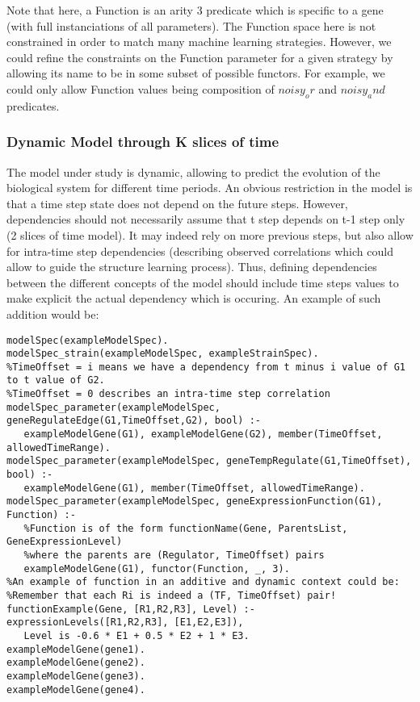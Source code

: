 \documentclass{article}
\begin{document}
Note that here, a Function is an arity 3 predicate which is specific to a gene (with full instanciations of all parameters). The Function space here is not constrained in order to match many machine learning strategies. However, we could refine the constraints on the Function parameter for a given strategy by allowing its name to be in some subset of possible functors. For example, we could only allow Function values being composition of $noisy_or$ and $noisy_and$ predicates.
\subsubsection{Dynamic Model through K slices of time}

The model under study is dynamic, allowing to predict the evolution of the biological system for different time periods. An obvious restriction in the model is that a time step state does not depend on the future steps. However, dependencies should not necessarily assume that t step depends on t-1 step only (2 slices of time model). It may indeed rely on more previous steps, but also allow for intra-time step dependencies (describing observed correlations which could allow to guide the structure learning process). Thus, defining dependencies between the different concepts of the model should include time steps values to make explicit the actual dependency which is occuring. An example of such addition would be:
  
\begin{verbatim}
modelSpec(exampleModelSpec).
modelSpec_strain(exampleModelSpec, exampleStrainSpec). 
%TimeOffset = i means we have a dependency from t minus i value of G1 to t value of G2.
%TimeOffset = 0 describes an intra-time step correlation
modelSpec_parameter(exampleModelSpec, geneRegulateEdge(G1,TimeOffset,G2), bool) :-
   exampleModelGene(G1), exampleModelGene(G2), member(TimeOffset, allowedTimeRange).
modelSpec_parameter(exampleModelSpec, geneTempRegulate(G1,TimeOffset), bool) :-
   exampleModelGene(G1), member(TimeOffset, allowedTimeRange).
modelSpec_parameter(exampleModelSpec, geneExpressionFunction(G1), Function) :-
   %Function is of the form functionName(Gene, ParentsList, GeneExpressionLevel) 
   %where the parents are (Regulator, TimeOffset) pairs
   exampleModelGene(G1), functor(Function, _, 3).
%An example of function in an additive and dynamic context could be:
%Remember that each Ri is indeed a (TF, TimeOffset) pair!
functionExample(Gene, [R1,R2,R3], Level) :- expressionLevels([R1,R2,R3], [E1,E2,E3]), 
   Level is -0.6 * E1 + 0.5 * E2 + 1 * E3.
exampleModelGene(gene1).
exampleModelGene(gene2).
exampleModelGene(gene3).
exampleModelGene(gene4).
\end{verbatim}
\end{document}
